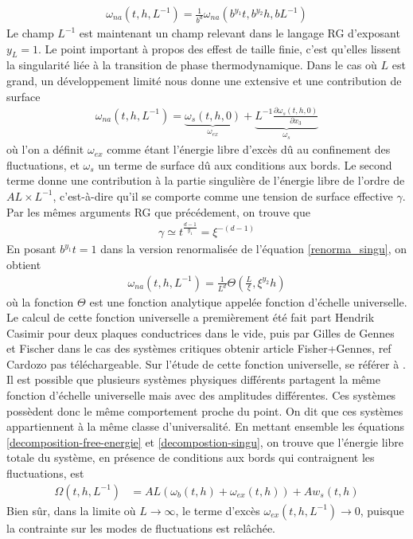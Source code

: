 \begin{align}
   \omega_{na}(t,h,L^{-1}) = \frac{1}{b^d}\omega_{na}(b^{y_1}t,b^{y_2}h,bL^{-1})
   \label{renorma_singu}
\end{align}
Le champ $L^{-1}$ est maintenant un champ relevant dans le langage RG d'exposant $y_L=1$. Le point important à propos  des effest de taille finie, c'est qu'elles lissent la singularité liée à la transition de phase thermodynamique. Dans le cas où $L$ est grand, un développement limité nous donne une extensive et une contribution de surface
\begin{align}
    \omega_{na}(t,h,L^{-1}) = \underbrace{\omega_s(t,h,0)}_{\omega_{ex}}  +\underbrace{L^{-1} \frac{\partial \omega_s(t,h,0)}{\partial x_3}}_{\omega_s}
    \label{decompostion-singu}
\end{align}
où l'on a définit $\omega_{ex}$ comme étant l'énergie libre d'excès dû au confinement des fluctuations, et $\omega_s$ un terme de surface dû aux conditions aux bords. Le second terme donne une contribution à la partie singulière de l'énergie libre de l'ordre de $AL \times L^{-1}$, c'est-à-dire qu'il se comporte comme une tension de surface effective $\gamma$. Par les mêmes arguments RG que précédement, on  trouve que 
\begin{align}
    \gamma \simeq t^{\frac{d-1}{y_1}} = \xi^{-(d-1)}
    \label{temp-xi}
\end{align}
En posant $b^{y_1}t=1$ dans la version renormalisée de l'équation \ref{renorma_singu}, on obtient 
\begin{align}
    \omega_{na}(t,h,L^{-1}) = \frac{1}{L^d} \Theta(\frac{L}{\xi},\xi^{y_2}h)
    \label{theta-universel}
\end{align}
où la fonction $\Theta$ est une fonction analytique appelée fonction d'échelle universelle. Le calcul de cette fonction universelle a premièrement été fait part Hendrik Casimir \cite{h_b_g_casimir_attraction_1948} pour deux plaques conductrices dans le vide, puis par Gilles de Gennes et Fischer dans le cas des systèmes critiques {\color{red}obtenir article Fisher+Gennes, ref Cardozo pas téléchargeable}. Sur l'étude de cette fonction universelle, se référer à \cite{gambassi_critical_2009,cardozo_finite_2015}.
Il est possible que plusieurs systèmes physiques différents partagent la même fonction d'échelle universelle mais avec des amplitudes différentes. Ces systèmes possèdent donc le même comportement proche du point. On dit que ces systèmes appartiennent à la même classe d'universalité.
En mettant ensemble les équations \ref{decomposition-free-energie} et \ref{decompostion-singu}, on trouve que l'énergie libre totale du système, en présence de conditions aux bords qui contraignent les fluctuations, est
\begin{align}
    \Omega(t,h,L^{-1}) &= A L \left( \omega_b(t,h) +  \omega_{ex}(t,h) \right) + A w_s(t,h) 
    \label{full-decomposition}
\end{align}
Bien sûr, dans la limite où $L\to \infty$, le terme d'excès $\omega_{ex}(t,h,L^{-1}) \to 0$, puisque la contrainte sur les modes de fluctuations est relâchée. 

